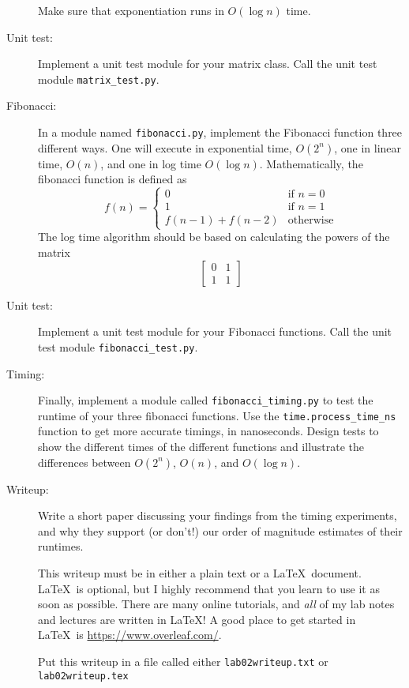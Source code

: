 \documentclass{article}
\begin{document}
\begin{description}
Make sure that exponentiation runs in $O(\log n)$ time.

\item[Unit test:]  Implement a unit test module for your matrix class. Call
the unit test module \lstinline{matrix_test.py}.

\item[Fibonacci:]  In a module named \lstinline{fibonacci.py},
implement the Fibonacci function three different ways.  One will
execute in exponential time, $O(2^n)$, one in linear time, $O(n)$, and one in log time
$O(\log n)$.
Mathematically, the fibonacci function is 
defined as 
\[
f(n) = \left\{\begin{array}{ll}
     0 & \mbox{if } n = 0\\
       1 & \mbox{if } n = 1\\
       f(n-1) + f(n-2) & \mbox{otherwise}\end{array}\right.
 \]
 The log time algorithm should be based on calculating
 the powers of the matrix
 \[
 \left[\begin{array}{cc}0 & 1 \\ 1 & 1 \end{array}\right]
 \]
 
 \item[Unit test:] Implement a unit test module for your
 Fibonacci functions.  Call the unit test module \lstinline{fibonacci_test.py}.
 
 \item[Timing:] Finally, implement a module called \lstinline{fibonacci_timing.py}
 to test the runtime
 of your three fibonacci functions.  Use the \lstinline{time.process_time_ns}
 function to get more accurate timings, in nanoseconds.  Design
 tests to show the different times of the different functions and illustrate
 the differences between $O(2^n)$, $O(n)$, and $O(\log n)$.
 
 \item[Writeup:]  Write a short paper discussing your findings from the
 timing experiments, and why they support (or don't!) our order of
 magnitude estimates of their runtimes. 
 
 This writeup must be in either a plain text or a \LaTeX\ document.
 \LaTeX\ is optional, but I highly recommend that you learn to use
 it as soon as possible.  There are many online tutorials, and {\em all}
 of my lab notes and lectures are written in \LaTeX!  A good place to
 get started in \LaTeX\ is \url{https://www.overleaf.com/}.
 
 Put this writeup in a file
 called either {\tt lab02writeup.txt}
 or  {\tt lab02writeup.tex}
 

\end{description}
\end{document}
